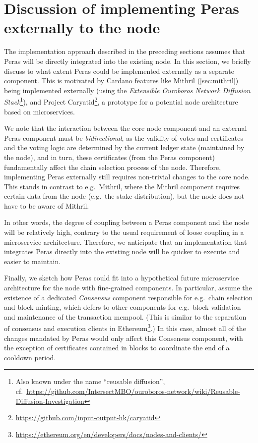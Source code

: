 \section{Discussion of implementing Peras externally to the node}

The implementation approach described in the preceding sections assumes that Peras will be directly integrated into the existing node.
In this section, we briefly discuss to what extent Peras could be implemented externally as a separate component.
This is motivated by Cardano features like Mithril (\cref{sec:mithril}) being implemented externally (using the \emph{Extensible Ouroboros Network Diffusion Stack}\footnote{Also known under the name \enquote{reusable diffusion}, cf.~\url{https://github.com/IntersectMBO/ouroboros-network/wiki/Reusable-Diffusion-Investigation}}), and Project Caryatid\footnote{\url{https://github.com/input-output-hk/caryatid}}, a prototype for a potential node architecture based on microservices.

We note that the interaction between the core node component and an external Peras component must be \emph{bidirectional}, as the validity of votes and certificates and the voting logic are determined by the current ledger state (maintained by the node), and in turn, these certificates (from the Peras component) fundamentally affect the chain selection process of the node.
Therefore, implementing Peras externally still requires non-trivial changes to the core node.
This stands in contrast to e.g.\ Mithril, where the Mithril component requires certain data from the node (e.g.\ the stake distribution), but the node does not have to be aware of Mithril.

In other words, the degree of coupling between a Peras component and the node will be relatively high, contrary to the usual requirement of loose coupling in a microservice architecture.
Therefore, we anticipate that an implementation that integrates Peras directly into the existing node will be quicker to execute and easier to maintain.

\medskip%
Finally, we sketch how Peras could fit into a hypothetical future microservice architecture for the node with fine-grained components.
In particular, assume the existence of a dedicated \emph{Consensus} component responsible for e.g.\ chain selection and block minting, which defers to other components for e.g.~block validation and maintenance of the transaction mempool.
(This is similar to the separation of consensus and execution clients in Ethereum\footnote{\url{https://ethereum.org/en/developers/docs/nodes-and-clients/}}.)
In this case, almost all of the changes mandated by Peras would only affect this Consensus component, with the exception of certificates contained in blocks to coordinate the end of a cooldown period.

